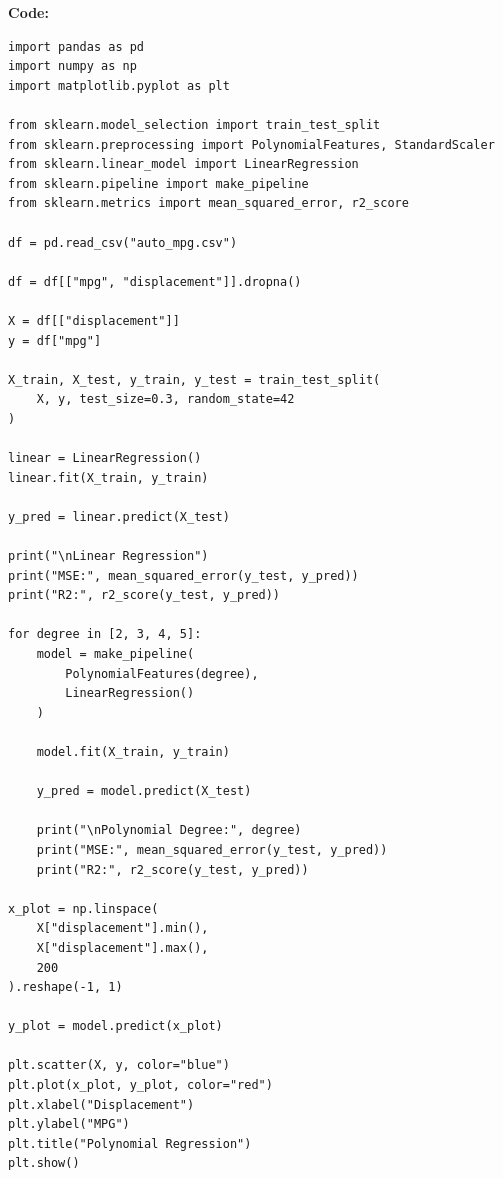 \documentclass[12pt, a4paper]{article}
\begin{document}
\vspace{\baselineskip}
\noindent \textbf{Code:}\\
\begin{lstlisting}
import pandas as pd
import numpy as np
import matplotlib.pyplot as plt

from sklearn.model_selection import train_test_split
from sklearn.preprocessing import PolynomialFeatures, StandardScaler
from sklearn.linear_model import LinearRegression
from sklearn.pipeline import make_pipeline
from sklearn.metrics import mean_squared_error, r2_score

df = pd.read_csv("auto_mpg.csv")

df = df[["mpg", "displacement"]].dropna()

X = df[["displacement"]]
y = df["mpg"]

X_train, X_test, y_train, y_test = train_test_split(
    X, y, test_size=0.3, random_state=42
)

linear = LinearRegression()
linear.fit(X_train, y_train)

y_pred = linear.predict(X_test)

print("\nLinear Regression")
print("MSE:", mean_squared_error(y_test, y_pred))
print("R2:", r2_score(y_test, y_pred))

for degree in [2, 3, 4, 5]:
    model = make_pipeline(
        PolynomialFeatures(degree),
        LinearRegression()
    )

    model.fit(X_train, y_train)

    y_pred = model.predict(X_test)

    print("\nPolynomial Degree:", degree)
    print("MSE:", mean_squared_error(y_test, y_pred))
    print("R2:", r2_score(y_test, y_pred))

x_plot = np.linspace(
    X["displacement"].min(),
    X["displacement"].max(),
    200
).reshape(-1, 1)

y_plot = model.predict(x_plot)

plt.scatter(X, y, color="blue")
plt.plot(x_plot, y_plot, color="red")
plt.xlabel("Displacement")
plt.ylabel("MPG")
plt.title("Polynomial Regression")
plt.show()
\end{lstlisting}

\vspace{\baselineskip}
\end{document}
